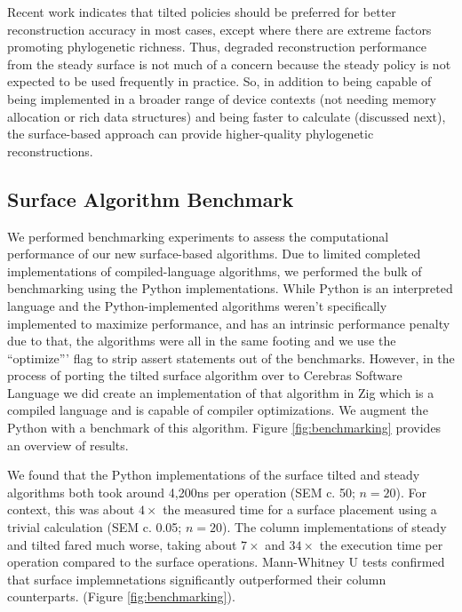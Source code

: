 Recent work indicates that tilted policies should be preferred for better reconstruction accuracy in most cases, except where there are extreme factors promoting phylogenetic richness.
Thus, degraded reconstruction performance from the steady surface is not much of a concern because the steady policy is not expected to be used frequently in practice.
So, in addition to being capable of being implemented in a broader range of device contexts (not needing memory allocation or rich data structures) and being faster to calculate (discussed next), the surface-based approach can provide higher-quality phylogenetic reconstructions.

\subsection{Surface Algorithm Benchmark}



We performed benchmarking experiments to assess the computational performance of our new surface-based algorithms.
Due to limited completed implementations of compiled-language algorithms, we performed the bulk of benchmarking using the Python implementations.
While Python is an interpreted language and the Python-implemented algorithms weren't specifically implemented to maximize performance, and has an intrinsic performance penalty due to that, the algorithms were all in the same footing and we use the ``optimize''' flag to strip assert statements out of the benchmarks.
However, in the process of porting the tilted surface algorithm over to Cerebras Software Language we did create an implementation of that algorithm in Zig which is a compiled language and is capable of compiler optimizations.
We augment the Python with a benchmark of this algorithm.
Figure \ref{fig:benchmarking} provides an overview of results.

We found that the Python implementations of the surface tilted and steady algorithms both took around 4,200ns per operation (SEM c. 50; $n=20$).
For context, this was about $4\times$ the measured time for a surface placement using a trivial calculation (SEM c. 0.05; $n=20$).
The column implementations of steady and tilted fared much worse, taking about $7\times$ and $34\times$ the execution time per operation compared to the surface operations.
Mann-Whitney U tests confirmed that surface implemnetations significantly outperformed their column counterparts. (Figure \ref{fig:benchmarking}).

